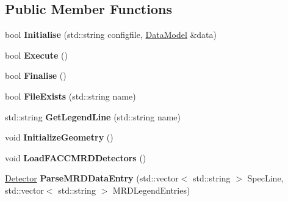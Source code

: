 \subsection*{Public Member Functions}
\begin{DoxyCompactItemize}
\item 
\hypertarget{classLoadGeometry_aa1dfd5b2b31bc8dd32ec9c32d5a87f39}{bool {\bfseries Initialise} (std\-::string configfile, \hyperlink{classDataModel}{Data\-Model} \&data)}\label{classLoadGeometry_aa1dfd5b2b31bc8dd32ec9c32d5a87f39}

\item 
\hypertarget{classLoadGeometry_ad0b7de30c6142a5c1aa3ce5bb0f6adb5}{bool {\bfseries Execute} ()}\label{classLoadGeometry_ad0b7de30c6142a5c1aa3ce5bb0f6adb5}

\item 
\hypertarget{classLoadGeometry_ac13c3cfe39b857070143c37f8c0c74f3}{bool {\bfseries Finalise} ()}\label{classLoadGeometry_ac13c3cfe39b857070143c37f8c0c74f3}

\item 
\hypertarget{classLoadGeometry_a192b20dbff10b16767e60e6fc68dcdb1}{bool {\bfseries File\-Exists} (std\-::string name)}\label{classLoadGeometry_a192b20dbff10b16767e60e6fc68dcdb1}

\item 
\hypertarget{classLoadGeometry_a28fd063cca1f53e038320ea888fda636}{std\-::string {\bfseries Get\-Legend\-Line} (std\-::string name)}\label{classLoadGeometry_a28fd063cca1f53e038320ea888fda636}

\item 
\hypertarget{classLoadGeometry_a4303d74ac8cc0c015e73239beb170c44}{void {\bfseries Initialize\-Geometry} ()}\label{classLoadGeometry_a4303d74ac8cc0c015e73239beb170c44}

\item 
\hypertarget{classLoadGeometry_ab7fb2565b705f80e786b7cfa2f60dfc6}{void {\bfseries Load\-F\-A\-C\-C\-M\-R\-D\-Detectors} ()}\label{classLoadGeometry_ab7fb2565b705f80e786b7cfa2f60dfc6}

\item 
\hypertarget{classLoadGeometry_ac355939a78bda934e9efc64f3d801c95}{\hyperlink{classDetector}{Detector} {\bfseries Parse\-M\-R\-D\-Data\-Entry} (std\-::vector$<$ std\-::string $>$ Spec\-Line, std\-::vector$<$ std\-::string $>$ M\-R\-D\-Legend\-Entries)}\label{classLoadGeometry_ac355939a78bda934e9efc64f3d801c95}

\end{DoxyCompactItemize}
